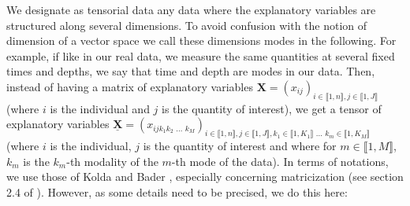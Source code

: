 \documentclass[preprint,12pt]{elsarticle}
\begin{document}
\indent We designate as tensorial data any data where the explanatory variables are structured along several dimensions. To avoid confusion with the notion of dimension of a vector space we call these dimensions modes in the following. For example, if like in our real data, we measure the same quantities at several fixed times and depths, we say that time and depth are modes in our data. Then, instead of having a matrix of explanatory variables $\mathbf{X} = (x_{ij})_{i \in \llbracket 1, n \rrbracket, j \in \llbracket 1, J \rrbracket}$ (where $i$ is the individual and $j$ is the quantity of interest), we get a tensor of explanatory variables $\underline{\mathbf{X}} = (x_{ijk_1k_2\text{ ... }k_M})_{i \in \llbracket 1, n \rrbracket, j \in \llbracket 1, J \rrbracket, k_1 \in \llbracket 1, K_1 \rrbracket \text{ ... } k_m \in\llbracket 1, K_M \rrbracket } $  (where $i$ is the individual, $j$ is the quantity of interest and where for $m \in \llbracket 1, M \rrbracket$, $k_m$ is the $k_m$-th modality of the $m$-th mode of the data). In terms of notations, we use those of Kolda and Bader \cite{conventions}, especially concerning matricization (see section 2.4 of \cite{conventions}). However, as some details need to be precised, we do this here:\\
\end{document}
